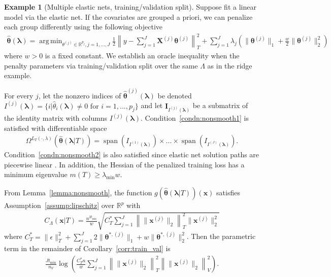 \documentclass[12pt]{article} %
\theoremstyle{definition}
\newtheorem{example}{Example}
\DeclareMathOperator{\spann}{span}
\DeclareMathOperator*{\argmin}{arg\,min}
\begin{document}
\begin{example}[Multiple elastic nets, training/validation split]
	\label{ex:elastic_net_tv}
	Suppose fit a linear model via the elastic net.
	If the covariates are grouped a priori, we can penalize each group differently using the following objective
	\begin{align}
	\hat{\boldsymbol{\theta}}(\boldsymbol{\lambda})
	=\argmin_{\theta^{(j)} \in \mathbb{R}^{p_j}, j = 1,...,J}
	\frac{1}{2} \left \| y - \sum_{j=1}^J \boldsymbol{X}^{(j)} \boldsymbol{\theta}^{(j)} \right \|_T^2
	+ \sum_{j=1}^J \lambda_j \left(
	\| \boldsymbol{\theta}^{(j)}\|_1
	+ \frac{w}{2} \| \boldsymbol{\theta}^{(j)}\|_2^2
	\right)
	\label{eq:elastic_net_ex}
	\end{align}
	where $w > 0$ is a fixed constant.
	We establish an oracle inequality when the penalty parameters via training/validation split over the same
	$\Lambda$ as in the ridge example.

	For every $j$, let the nonzero indices of $\hat{\boldsymbol{\theta}}^{(j)}(\boldsymbol{\lambda})$ be denoted $I^{(j)}(\boldsymbol\lambda) = \{i | \hat{\theta}_i(\boldsymbol\lambda) \ne 0 \text{ for } i=1,...,p_j \}$ and let $\boldsymbol I_{I^{(j)}(\boldsymbol \lambda)}$ be a submatrix of the identity matrix with columns $I^{(j)}(\boldsymbol\lambda)$.
	Condition~\ref{condn:nonsmooth1} is satisfied with differentiable space
	\begin{align}
	\Omega^{L_T(\cdot, \lambda)}(\hat{\boldsymbol{\theta}}(\boldsymbol{\lambda} | T))
	= \spann(I_{I^{(1)}(\boldsymbol \lambda)}) \times ... \times \spann(I_{I^{(J)}(\boldsymbol \lambda)}).
	\label{eq:en_diff_space}
	\end{align}
	Condition~\ref{condn:nonsmooth2} is also satisfied since elastic net solution paths are piecewise linear \citep{zou2003regression}.
	In addition, the Hessian of the penalized training loss has a minimum eigenvalue $m(T) \ge \lambda_{\min}w$.

	From Lemma~\ref{lemma:nonsmooth}, the function $g(\hat{\boldsymbol{\theta}}(\boldsymbol{\lambda} |T))(\boldsymbol{x})$ satisfies Assumption~\ref{assump:lipschitz} over $\mathbb{R}^p$ with
	\begin{align}
	C_\Lambda \left ( \boldsymbol{x} | T \right ) =
	\frac{n^{2t_{\min}}}{w}
	\sqrt{
	C^*_T
	\sum_{j = 1}^J
	\left \|
	\|\boldsymbol{x}^{(j)} \|_2
	\right \|_T^2
	\|\boldsymbol{x}^{(j)}\|_2^2
	}
	\label{eq:elastic_lipschitz}
	\end{align}
	where
	$
	C^*_T =
	\|\epsilon\|_{T}^{2}
	+\sum_{j=1}^J
	2 \|\boldsymbol{\theta}^{*,(j)}\|_1
	+ w\|\boldsymbol{\theta}^{*,(j)}\|_2^2
	$.
	Then the parametric term in the remainder of Corollary~\ref{corr:train_val} is
	\begin{align}
	\frac{J t_{\min}}{n_{V}}
	\log \left (
	\frac{C^*_T n}{w}
	\sum_{j=1}^J
	\left \| \|\boldsymbol{x}^{(j)}\|_2 \right \|_T^2 \left \| \|\boldsymbol{x}^{(j)}\|_2 \right \|_V^2
	\right ).
	\end{align}
\end{example}
\end{document}
